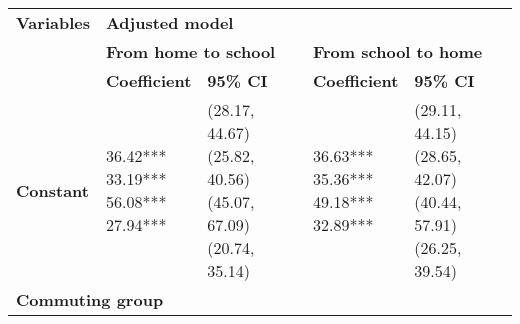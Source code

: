 \documentclass[10pt]{article}
\begin{document}
      \setlength{\fboxsep}{0pt}
      \begin{table}
      \begin{center}
      \begin{small}
      \begin{tabular}{lllll}
      \toprule
        \textbf{Variables}
          & \multicolumn{4}{l}{\textbf{Adjusted model}} \\ \cline{2-5}
        & \multicolumn{2}{l}{\textbf{From home to school}} 
          & \multicolumn{2}{l}{\textbf{From school to home}} \\ \cline{2-3} \cline{4-5}
        & \textbf{Coefficient} & \textbf{95\% CI} & \textbf{Coefficient} & \textbf{95\% CI} \\
      \midrule
    \textbf{Constant}    &  \makecell[l]{\textnormal{36.42***} \\\textnormal{33.19***} \\\textnormal{56.08***} \\\textnormal{27.94***} \\}   &  \makecell[l]{\textnormal{(28.17, 44.67)} \\\textnormal{(25.82, 40.56)} \\\textnormal{(45.07, 67.09)} \\\textnormal{(20.74, 35.14)} \\}   &  \makecell[l]{\textnormal{36.63***} \\\textnormal{35.36***} \\\textnormal{49.18***} \\\textnormal{32.89***} \\}   &  \makecell[l]{\textnormal{(29.11, 44.15)} \\\textnormal{(28.65, 42.07)} \\\textnormal{(40.44, 57.91)} \\\textnormal{(26.25, 39.54)} \\} \\ 
\multicolumn{5}{l}{\textbf{Commuting group}} \\ 

\end{tabular}
\end{small}
\end{center}
\end{table}
\end{document}
